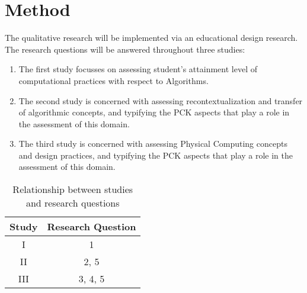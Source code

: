 \section{Method}\label{sec:method}

The qualitative research will be implemented via an educational design research. The research questions will be answered throughout three studies:
\begin{enumerate}[label=\Roman*.]
\item The first study focusses on assessing student's attainment level of computational practices with respect to Algorithms. %



\item The second study is concerned with assessing recontextualization and transfer of algorithmic concepts, and typifying the PCK aspects that play a role in the assessment of this domain.

\item The third study is concerned with assessing Physical Computing concepts and design practices, and typifying the PCK aspects that play a role in the assessment of this domain.
\end{enumerate}



\begin{table*}
  \centering
\begin{tabular}{|c|c|}
  \hline
  \textbf{Study} & \textbf{Research Question}  \\
  \hline
    I & 1 \\ \hline
    II & 2, 5 \\ \hline
    III & 3, 4, 5 \\ \hline
\end{tabular}
\caption{Relationship between studies and research questions}\label{table:studiesVsQues}
\end{table*}

